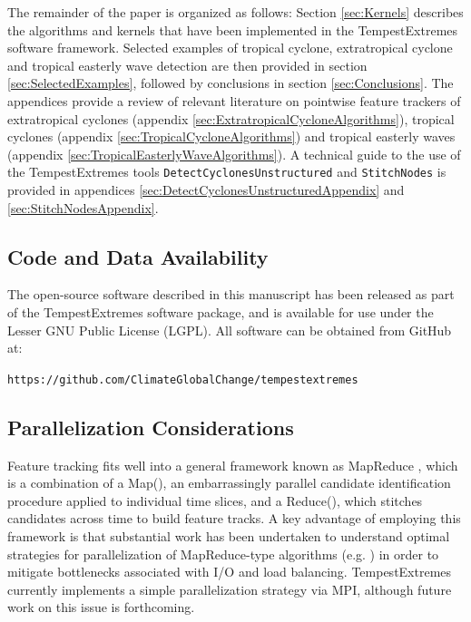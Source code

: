 \documentclass[gmdd, hvmath, online]{copernicus_discussions}
\begin{document}
The remainder of the paper is organized as follows:  Section \ref{sec:Kernels} describes the algorithms and kernels that have been implemented in the TempestExtremes software framework.  Selected examples of tropical cyclone, extratropical cyclone and tropical easterly wave detection are then provided in section \ref{sec:SelectedExamples}, followed by conclusions in section \ref{sec:Conclusions}.  The appendices provide a review of relevant literature on pointwise feature trackers of extratropical cyclones (appendix \ref{sec:ExtratropicalCycloneAlgorithms}), tropical cyclones (appendix \ref{sec:TropicalCycloneAlgorithms}) and tropical easterly waves (appendix \ref{sec:TropicalEasterlyWaveAlgorithms}).  A technical guide to the use of the TempestExtremes tools \texttt{DetectCyclonesUnstructured} and \texttt{StitchNodes} is provided in appendices \ref{sec:DetectCyclonesUnstructuredAppendix} and \ref{sec:StitchNodesAppendix}.

\subsection{Code and Data Availability}

The open-source software described in this manuscript has been released as part of the TempestExtremes software package, and is available for use under the Lesser GNU Public License (LGPL).  All software can be obtained from GitHub at:
\begin{center}
\texttt{https://github.com/ClimateGlobalChange/tempestextremes}
\end{center} 

\subsection{Parallelization Considerations}

Feature tracking fits well into a general framework known as MapReduce \citep{dean2008mapreduce}, which is a combination of a Map(), an embarrassingly parallel candidate identification procedure applied to individual time slices, and a Reduce(), which stitches candidates across time to build feature tracks.  A key advantage of employing this framework is that substantial work has been undertaken to understand optimal strategies for parallelization of MapReduce-type algorithms (e.g. \cite{Prabhat2012}) in order to mitigate bottlenecks associated with I/O and load balancing.  TempestExtremes currently implements a simple parallelization strategy via MPI, although future work on this issue is forthcoming.
\end{document}
